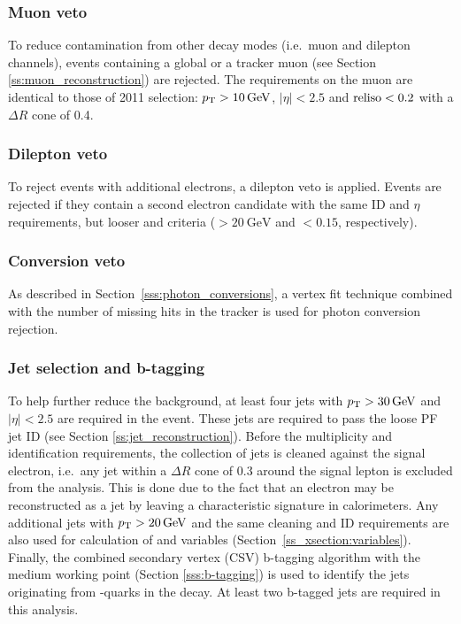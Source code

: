 \subsubsection*{Muon veto}
To reduce contamination from other \ttbar decay modes (i.e.\ muon and dilepton channels), events containing a global or
a tracker muon (see Section \ref{ss:muon_reconstruction}) are rejected. The requirements on the muon are identical to
those of 2011 selection: $\pt > \SI{10}{\GeV}$, $|\eta| < 2.5$ and $\textrm{reliso} < 0.2$ with a $\Delta R$ cone of \num{0.4}.

\subsubsection*{Dilepton veto}
To reject events with additional electrons, a dilepton veto is applied. Events are rejected if they contain a second
electron candidate with the same ID and $\eta$ requirements, but looser \ET and \reliso criteria ($>\SI{20}{\GeV}$ and
$<0.15$, respectively).

\subsubsection*{Conversion veto}
As described in Section~\ref{sss:photon_conversions}, a vertex fit technique combined with the number of missing hits
in the tracker is used for photon conversion rejection.

\subsubsection*{Jet selection and b-tagging}
To help further reduce the background, at least four jets with $\pt > \SI{30}{\GeV}$ and $|\eta| < 2.5$ are required in
the event. These jets are required to pass the loose PF jet ID (see Section \ref{ss:jet_reconstruction}). Before the
multiplicity and identification requirements, the collection of jets is cleaned against the signal electron, i.e.\ any
jet within a $\Delta R$ cone of \num{0.3} around the signal lepton is excluded from the analysis. This is done due to
the fact that an electron may be reconstructed as a jet by leaving a characteristic signature in calorimeters. Any
additional jets with $\pt > \SI{20}{\GeV}$ and the same cleaning and ID requirements are also used for calculation of
\HT and \ST variables (Section~\ref{ss_xsection:variables}). Finally, the combined secondary vertex (CSV) b-tagging
algorithm with the medium working point (Section \ref{sss:b-tagging}) is used to identify the jets originating from
\cPqb-quarks in the \ttbar decay. At least two b-tagged jets are required in this analysis.


